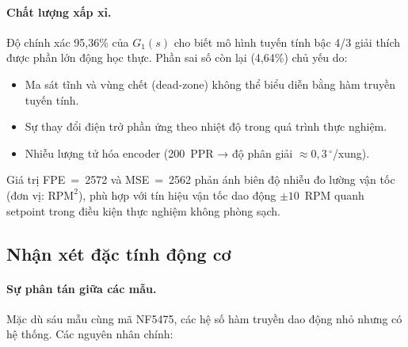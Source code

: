 \paragraph{Chất lượng xấp xỉ.}
Độ chính xác 95,36\% của $G_1(s)$ cho biết mô hình tuyến tính bậc 4/3 giải thích
được phần lớn động học thực. Phần sai số còn lại (4,64\%) chủ yếu do:
\begin{itemize}
    \item Ma sát tĩnh và vùng chết (dead-zone) không thể biểu diễn bằng hàm truyền tuyến tính.
    \item Sự thay đổi điện trở phần ứng theo nhiệt độ trong quá trình thực nghiệm.
    \item Nhiễu lượng tử hóa encoder (200~PPR → độ phân giải $\approx 0{,}3\,^\circ$/xung).
\end{itemize}
Giá trị FPE~=~2572 và MSE~=~2562 phản ánh biên độ nhiễu đo lường vận tốc
(đơn vị: $\text{RPM}^2$), phù hợp với tín hiệu vận tốc dao động $\pm 10$~RPM
quanh setpoint trong điều kiện thực nghiệm không phòng sạch.

\subsection{Nhận xét đặc tính động cơ}
\label{subsec:motor_char}

\paragraph{Sự phân tán giữa các mẫu.}
Mặc dù sáu mẫu cùng mã NF5475, các hệ số hàm truyền dao động nhỏ nhưng có hệ thống.
Các nguyên nhân chính:

